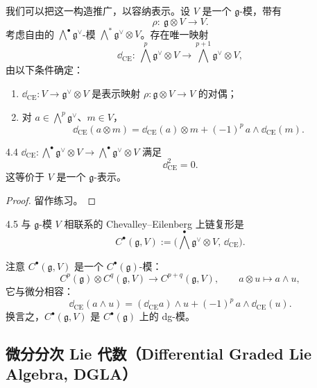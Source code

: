 我们可以把这一构造推广，以容纳表示。设 $V$ 是一个 $\mathfrak g$-模，带有
\[
  \rho:\ \mathfrak g\otimes V\longrightarrow V.
\]
考虑自由的 $\bigwedge^{\bullet}\mathfrak g^{\vee}$-模
$\bigwedge^{*}\mathfrak g^{\vee}\otimes V$。存在唯一映射
\[
  \dd_{\mathrm{CE}}:\ \bigwedge^{p}\mathfrak g^{\vee}\otimes V
  \longrightarrow\bigwedge^{p+1}\mathfrak g^{\vee}\otimes V,
\]
由以下条件确定：
\begin{enumerate}[label=\arabic*),leftmargin=1.8em,itemsep=0.2em]
  \item $\dd_{\mathrm{CE}}:V\to\mathfrak g^{\vee}\otimes V$ 是表示映射
        $\rho:\mathfrak g\otimes V\to V$ 的对偶；
  \item 对 $a\in\bigwedge^{p}\mathfrak g^{\vee}$、$m\in V$，
  \[
    \dd_{\mathrm{CE}}(a\otimes m)
    =\dd_{\mathrm{CE}}(a)\otimes m+(-1)^{p}\,a\wedge \dd_{\mathrm{CE}}(m).
  \]
\end{enumerate}

\begin{wprop}{4.4}
  $\dd_{\mathrm{CE}}:\bigwedge^{\bullet}\mathfrak g^{\vee}\otimes V
  \to\bigwedge^{\bullet}\mathfrak g^{\vee}\otimes V$ 满足
  \[
    \dd_{\mathrm{CE}}^2=0.
  \]
  这等价于 $V$ 是一个 $\mathfrak g$-表示。
\end{wprop}

\begin{proof}
  留作练习。
\end{proof}

\begin{wdefn}{4.5}
  与 $\mathfrak g$-模 $V$ 相联系的 Chevalley--Eilenberg 上链复形是
  \[
    C^{\bullet}(\mathfrak g,V)
    :=\bigl(\bigwedge^{\bullet}\mathfrak g^{\vee}\otimes V,\,
    \dd_{\mathrm{CE}}\bigr).
  \]
\end{wdefn}

注意 $C^{\bullet}(\mathfrak g,V)$ 是一个 $C^{\bullet}(\mathfrak g)$-模：
\[
  C^{p}(\mathfrak g)\otimes C^{q}(\mathfrak g,V)\longrightarrow
  C^{p+q}(\mathfrak g,V),
  \qquad a\otimes u\longmapsto a\wedge u,
\]
它与微分相容：
\[
  \dd_{\mathrm{CE}}(a\wedge u)
  =(\dd_{\mathrm{CE}}a)\wedge u+(-1)^{p}\,a\wedge \dd_{\mathrm{CE}}(u).
\]
换言之，$C^{\bullet}(\mathfrak g,V)$ 是 $C^{\bullet}(\mathfrak g)$ 上的 dg-模。

\subsection{微分分次 Lie 代数（Differential Graded Lie Algebra, DGLA）}

